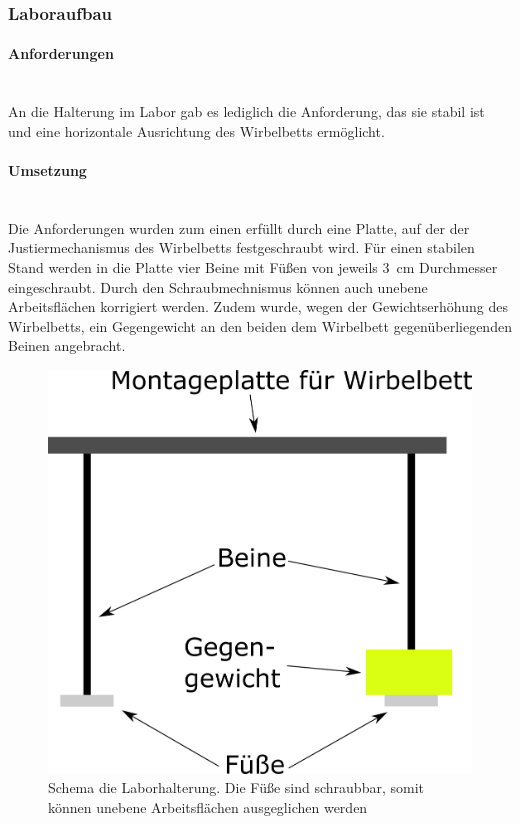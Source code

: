 \clearpage

\subsubsection{Laboraufbau}

\paragraph{Anforderungen}
\hfill \\
An die Halterung im Labor gab es lediglich die Anforderung, das sie stabil ist und eine horizontale Ausrichtung des Wirbelbetts ermöglicht.

\paragraph{Umsetzung}
\hfill \\
Die Anforderungen wurden zum einen erfüllt durch eine Platte, auf der der Justiermechanismus des Wirbelbetts festgeschraubt wird. Für einen stabilen Stand werden in die Platte vier Beine mit Füßen von jeweils \SI{3}{cm} Durchmesser eingeschraubt. Durch den Schraubmechnismus können auch unebene Arbeitsflächen korrigiert werden. Zudem wurde, wegen der Gewichtserhöhung des Wirbelbetts, ein Gegengewicht an den beiden dem Wirbelbett gegenüberliegenden Beinen angebracht.



\begin{figure}[h!]
	\begin{center}
	\includegraphics[scale=0.7]{Halterung_Labor_Seite.png}
	\caption[Halterung Labor]{Schema die Laborhalterung. Die Füße sind schraubbar, somit können unebene Arbeitsflächen ausgeglichen werden}
    \end{center}
\end{figure}


